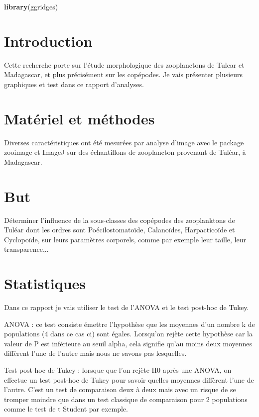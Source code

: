 \documentclass[]{article}
\newenvironment{Shaded}{\begin{snugshade}}{\end{snugshade}}
\newcommand{\KeywordTok}[1]{\textcolor[rgb]{0.13,0.29,0.53}{\textbf{#1}}}
\newcommand{\NormalTok}[1]{#1}
\begin{document}
\begin{Shaded}
\begin{Highlighting}[]
\KeywordTok{library}\NormalTok{(ggridges)}
\end{Highlighting}
\end{Shaded}

\section{Introduction}\label{introduction}

Cette recherche porte sur l'étude morphologique des zooplanctons de
Tulear et Madagascar, et plus précisément sur les copépodes. Je vais
présenter plusieurs graphiques et test dans ce rapport d'analyses.

\section{Matériel et méthodes}\label{materiel-et-methodes}

Diverses caractéristiques ont été mesurées par analyse d'image avec le
package zooimage et ImageJ sur des échantillons de zooplancton provenant
de Tuléar, à Madagascar.

\section{But}\label{but}

Déterminer l'influence de la sous-classes des copépodes des zooplanktons
de Tuléar dont les ordres sont Poécilostomatoïde, Calanoïdes,
Harpacticoïde et Cyclopoïde, sur leurs paramètres corporels, comme par
exemple leur taille, leur transparence,..

\section{Statistiques}\label{statistiques}

Dans ce rapport je vais utiliser le test de l'ANOVA et le test post-hoc
de Tukey.

ANOVA : ce test consiste émettre l'hypothèse que les moyennes d'un
nombre k de populations (4 dans ce cas ci) sont égales. Lorsqu'on rejète
cette hypothèse car la valeur de P est inférieure au seuil alpha, cela
signifie qu'au moins deux moyennes diffèrent l'une de l'autre mais nous
ne savons pas lesquelles.

Test post-hoc de Tukey : lorsque que l'on rejète H0 après une ANOVA, on
effectue un test post-hoc de Tukey pour savoir quelles moyennes
diffèrent l'une de l'autre. C'est un test de comparaison deux à deux
mais avec un risque de se tromper moindre que dans un test classique de
comparaison pour 2 populations comme le test de t Student par exemple.
\end{document}
